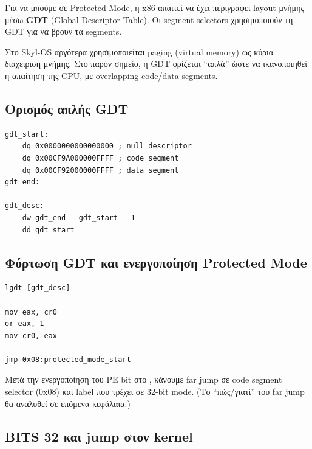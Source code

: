 \documentclass[18pt]{extarticle}
\begin{document}
Για να μπούμε σε Protected Mode, η x86 απαιτεί να έχει περιγραφεί layout μνήμης μέσω \textbf{GDT}
(Global Descriptor Table). Οι segment selectors χρησιμοποιούν τη GDT για να βρουν τα segments.

\begin{info}[Σημείωση]
Στο Skyl-OS αργότερα χρησιμοποιείται paging (virtual memory) ως κύρια διαχείριση μνήμης.
Στο παρόν σημείο, η GDT ορίζεται “απλά” ώστε να ικανοποιηθεί η απαίτηση της CPU, με overlapping code/data segments.
\end{info}

\subsection{Ορισμός απλής GDT}

\begin{file}
\footnotesize \begin{lstlisting}[language={[x86masm]Assembler}, tabsize=2]
gdt_start:
    dq 0x0000000000000000 ; null descriptor
    dq 0x00CF9A000000FFFF ; code segment
    dq 0x00CF92000000FFFF ; data segment
gdt_end:

gdt_desc:
    dw gdt_end - gdt_start - 1
    dd gdt_start
\end{lstlisting}
\end{file}

\subsection{Φόρτωση GDT και ενεργοποίηση Protected Mode}

\begin{file}
\footnotesize \begin{lstlisting}[language={[x86masm]Assembler}, tabsize=2]
lgdt [gdt_desc]

mov eax, cr0
or eax, 1
mov cr0, eax

jmp 0x08:protected_mode_start
\end{lstlisting}
\end{file}

Μετά την ενεργοποίηση του PE bit στο , κάνουμε far jump σε code segment selector (0x08) και label που
τρέχει σε 32-bit mode. (Το “πώς/γιατί” του far jump θα αναλυθεί σε επόμενα κεφάλαια.)

\subsection{BITS 32 και jump στον kernel}
\end{document}
